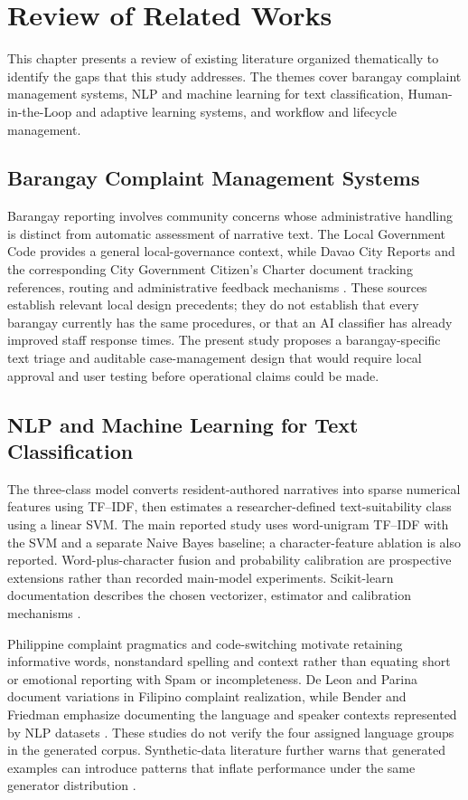 \chapter{Review of Related Works}

This chapter presents a review of existing literature organized thematically to identify the gaps that this study addresses. The themes cover barangay complaint management systems, NLP and machine learning for text classification, Human-in-the-Loop and adaptive learning systems, and workflow and lifecycle management.

\section{Barangay Complaint Management Systems}
Barangay reporting involves community concerns whose administrative handling is distinct from automatic assessment of narrative text. The Local Government Code provides a general local-governance context, while Davao City Reports and the corresponding City Government Citizen's Charter document tracking references, routing and administrative feedback mechanisms \cite{ra7160,dcr}. These sources establish relevant local design precedents; they do not establish that every barangay currently has the same procedures, or that an AI classifier has already improved staff response times. The present study proposes a barangay-specific text triage and auditable case-management design that would require local approval and user testing before operational claims could be made.

\section{NLP and Machine Learning for Text Classification}
The three-class model converts resident-authored narratives into sparse numerical features using TF--IDF, then estimates a researcher-defined text-suitability class using a linear SVM. The main reported study uses word-unigram TF--IDF with the SVM and a separate Naive Bayes baseline; a character-feature ablation is also reported. Word-plus-character fusion and probability calibration are prospective extensions rather than recorded main-model experiments. Scikit-learn documentation describes the chosen vectorizer, estimator and calibration mechanisms \cite{sklearn,sklearntfidf,sklearncalib}.

Philippine complaint pragmatics and code-switching motivate retaining informative words, nonstandard spelling and context rather than equating short or emotional reporting with Spam or incompleteness. De Leon and Parina document variations in Filipino complaint realization, while Bender and Friedman emphasize documenting the language and speaker contexts represented by NLP datasets \cite{deleon,benderfriedman}. These studies do not verify the four assigned language groups in the generated corpus. Synthetic-data literature further warns that generated examples can introduce patterns that inflate performance under the same generator distribution \cite{li2023,shaib}.

